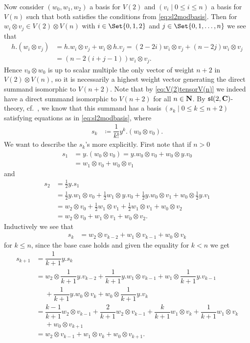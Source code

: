 Now consider $(w_0,w_1,w_2)$ a basis for $V(2)$ and $(v_i \mid 0\leq i\leq n)$ a basis for $V(n)$ such that both satisfies the conditions from \cref{eq:sl2modbasis}. Then for $w_i\otimes v_j \in V(2)\otimes V(n)$ with $i\in\Set{0,1,2}$ and $j\in\Set{0,1,\dotsc,n}$ we see that
\begin{align}
  h.(w_i\otimes v_j) &= h.w_i\otimes v_j + w_i\otimes h.v_j = (2-2i)w_i\otimes v_j + (n-2j)w_i\otimes v_j \nonumber \\
  &= (n-2(i+j-1))w_i\otimes v_j.\label{eq:hontensor}
\end{align}
Hence $v_0\otimes w_0$ is up to scalar multiple the only vector of weight $n+2$ in $V(2)\otimes V(n)$, so it is necessarily a highest weight vector generating the direct summand isomorphic to $V(n+2)$. Note that by \cref{eq:V(2)tensorV(n)} we indeed have a direct summand isomorphic to $V(n+2)$ for all $n\in\mathbf{N}$. By $\mathfrak{sl}(2,\mathbf{C})$-theory, cf.\ \cite[36]{jantzen}, we know that this summand has a basis $(s_k\mid 0\leq k\leq n+2)$ satisfying equations as in \cref{eq:sl2modbasis}, where
\begin{align*}
  s_k &\coloneqq \dfrac{1}{k!} y^k.(w_0\otimes v_0).
\end{align*}
We want to describe the $s_k$'s more explicitly. First note that if $n>0$
\begin{align*}
  s_1 &= y.(w_0\otimes v_0) = y.w_0\otimes v_0 + w_0\otimes y.v_0 \\
  &= w_1\otimes v_0 + w_0\otimes v_1
\end{align*}
and
\begin{align*}
  s_2 &= \tfrac{1}{2}y.s_1 \\
      &= \tfrac{1}{2}y.w_1\otimes v_0 + \tfrac{1}{2}w_1\otimes y.v_0 + \tfrac{1}{2}y.w_0\otimes v_1 + w_0\otimes \tfrac{1}{2}y.v_1 \\
      &= w_2\otimes v_0 + \tfrac{1}{2}w_1\otimes v_1 + \tfrac{1}{2}w_1\otimes v_1 + w_0\otimes v_2 \\
  &= w_2\otimes v_0 + w_1\otimes v_1 + w_0\otimes v_2.
\end{align*}
Inductively we see that
\begin{align*}
  s_k &= w_2\otimes v_{k-2} + w_1\otimes v_{k-1} + w_0\otimes v_k
\end{align*}
for $k\leq n$, since the base case holds and given the equality for $k<n$ we get
\begin{align*}
  s_{k+1} &= \dfrac{1}{k+1}y.s_k \\
          &= w_2\otimes\dfrac{1}{k+1}y.v_{k-2} + \dfrac{1}{k+1}y.w_1\otimes v_{k-1} + w_1\otimes\dfrac{1}{k+1}y.v_{k-1} \\
  &\phantom{{}={}}{} + \dfrac{1}{k+1}y.w_0\otimes v_k + w_0\otimes \dfrac{1}{k+1}y.v_k \\
          &= \dfrac{k-1}{k+1}w_2\otimes v_{k-1} + \dfrac{2}{k+1}w_2\otimes v_{k-1} + \dfrac{k}{k+1}w_1\otimes v_k + \dfrac{1}{k+1}w_1\otimes v_k \\
          &\phantom{{}={}}{} + w_0\otimes v_{k+1} \\
  &= w_2\otimes v_{k-1} + w_1\otimes v_k + w_0\otimes v_{k+1}.
\end{align*}
